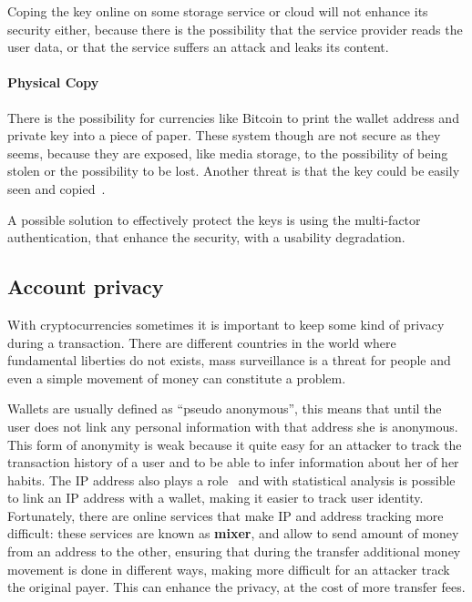 Coping the key online on some storage service or cloud will not enhance its
security either, because there is the possibility that the service provider
reads the user data, or that the service suffers an attack and leaks its
content.

\paragraph{Physical Copy} There is the possibility for currencies like Bitcoin
to print the wallet address and private key into a piece of paper. These system
though are not secure as they seems, because they are exposed, like media
storage, to the possibility of being stolen or the possibility to be lost.
Another threat is that the key could be easily seen and
copied~\cite{eskandari15}.


A possible solution to effectively protect the keys is using the multi-factor
authentication, that enhance the security, with a usability degradation.


\subsection{Account privacy}

With cryptocurrencies sometimes it is important to keep some kind of privacy
during a transaction. There are different countries in the world where
fundamental liberties do not exists, mass surveillance is a threat for
people and even a simple movement of money can constitute a problem.

Wallets are usually defined as ``pseudo anonymous'', this means that until the
user does not link any personal information with that address she is anonymous.
This form of anonymity is weak because it quite easy for an attacker to track
the transaction history of a user and to be able to infer information about her
of her habits. The IP address also plays a role~\cite{koshy14} and with
statistical analysis is possible to link an IP address with a wallet, making it
easier to track user identity.
Fortunately, there are online services that make IP and address tracking more
difficult: these services are known as \textbf{mixer}, and allow to send amount
of money from an address to the other, ensuring that during the transfer
additional money movement is done in different ways, making more difficult for
an attacker track the original payer. This can enhance the privacy, at the cost
of more transfer fees.
